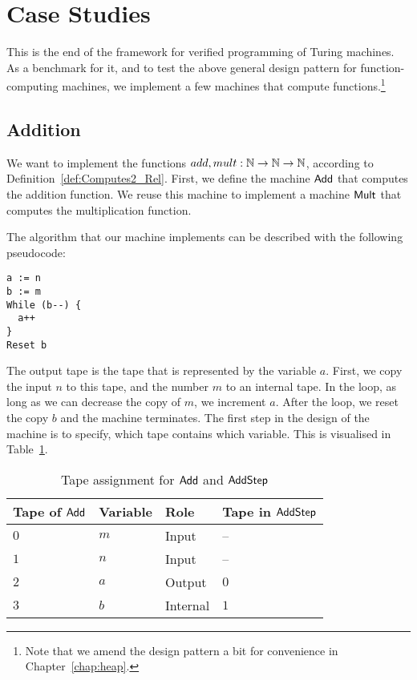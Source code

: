 \section{Case Studies}
\label{sec:case-studies}

This is the end of the framework for verified programming of Turing machines.  As a benchmark for it, and to test the above general design pattern for
function-computing machines, we implement a few machines that compute functions.\footnote{Note that we amend the design pattern a bit for convenience
  in Chapter~\ref{chap:heap}.}

\subsection{Addition}
\label{sec:Add}
%

We want to implement the functions $add,mult:\mathbb{N}\rightarrow\mathbb{N}\rightarrow\mathbb{N}$, according to Definition~\ref{def:Computes2_Rel}.  First, we define the machine
$\mathsf{Add}$ that computes the addition function.  We reuse this machine to implement a machine $\mathsf{Mult}$ that computes the multiplication function.

The algorithm that our machine implements can be described with the following pseudocode:%
{ \small
\begin{lstlisting}[style=pseudocode]
a := n
b := m
While (b--) {
  a++
}
Reset b
\end{lstlisting}
}%
The output tape is the tape that is represented by the variable $a$.  First, we copy the input $n$ to this tape, and the number $m$ to an internal
tape.  In the loop, as long as we can decrease the copy of $m$, we increment $a$.  After the loop, we reset the copy $b$ and the machine terminates.
The first step in the design of the machine is to specify, which tape contains which variable.  This is visualised in Table~\ref{tab:tapes-Add}.

\begin{table}[h]
  \centering
  \begin{tabular}{l|l|l|l}
     Tape of $\mathsf{Add}$ & Variable & Role      & Tape in $\mathsf{AddStep}$ \\ \hline
     $0$                & $m$      & Input     & --                     \\
     $1$                & $n$      & Input     & --                     \\
     $2$                & $a$      & Output    & $0$                    \\
     $3$                & $b$      & Internal  & $1$                    \\
  \end{tabular}
  \caption{Tape assignment for $\mathsf{Add}$ and $\mathsf{AddStep}$}
  \label{tab:tapes-Add}
\end{table}

